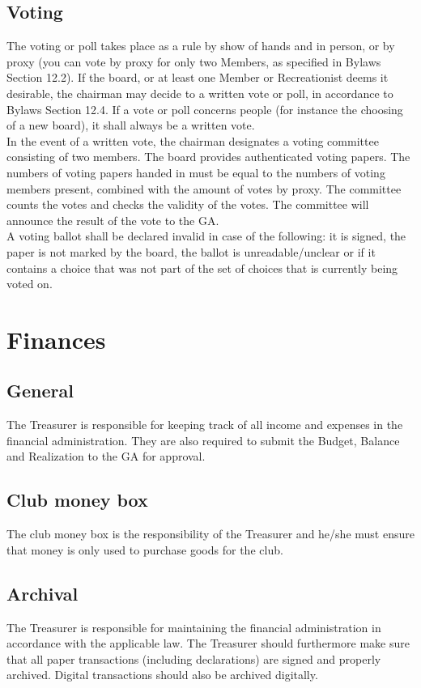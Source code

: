 \documentclass[a4paper]{article}
\newcommand{\Asta}{Bylaws} %
\begin{document}
\subsection{Voting}
The voting or poll takes place as a rule by show of hands and in person, or by proxy (you can vote by proxy for only two { Members}, as specified in { \Asta} Section 12.2). If the board, or at least one { Member} or { Recreationist} deems it desirable, the chairman may decide to a written vote or poll, in accordance to { \Asta} Section 12.4. If a vote or poll concerns people (for instance the choosing of a new board), it shall always be a written vote. \\ 

In the event of a written vote, the chairman designates a voting committee consisting of two members. The board provides authenticated voting papers. The numbers of voting papers handed in must be equal to the numbers of voting members present, combined with the amount of votes by proxy. The committee counts the votes and checks the validity of the votes. The committee will announce the result of the vote to the { GA}. \\

A voting ballot shall be declared invalid in case of the following: it is signed, the paper is not marked by the board, the ballot is unreadable/unclear or if it contains a choice that was not part of the set of choices that is currently being voted on.

\section{Finances}
\subsection{General}
The Treasurer is responsible for keeping track of all income and expenses in the financial administration. They are also required to submit the Budget, Balance and Realization to the { GA} for approval.

\subsection{Club money box}
The club money box is the responsibility of the Treasurer and he/she must ensure that money is only used to purchase goods for the club.

\subsection{Archival}
The Treasurer is responsible for maintaining the financial administration in accordance with the applicable law. The Treasurer should furthermore make sure that all paper transactions (including declarations) are signed and properly archived. Digital transactions should also be archived digitally.
\end{document}
